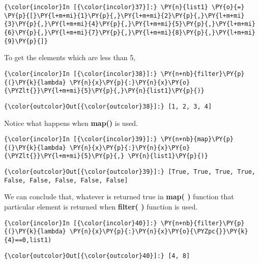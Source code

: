     \begin{Verbatim}[commandchars=\\\{\}]
{\color{incolor}In [{\color{incolor}37}]:} \PY{n}{list1} \PY{o}{=} \PY{p}{[}\PY{l+m+mi}{1}\PY{p}{,}\PY{l+m+mi}{2}\PY{p}{,}\PY{l+m+mi}{3}\PY{p}{,}\PY{l+m+mi}{4}\PY{p}{,}\PY{l+m+mi}{5}\PY{p}{,}\PY{l+m+mi}{6}\PY{p}{,}\PY{l+m+mi}{7}\PY{p}{,}\PY{l+m+mi}{8}\PY{p}{,}\PY{l+m+mi}{9}\PY{p}{]}
\end{Verbatim}

    To get the elements which are less than 5,

    \begin{Verbatim}[commandchars=\\\{\}]
{\color{incolor}In [{\color{incolor}38}]:} \PY{n+nb}{filter}\PY{p}{(}\PY{k}{lambda} \PY{n}{x}\PY{p}{:}\PY{n}{x}\PY{o}{\PYZlt{}}\PY{l+m+mi}{5}\PY{p}{,}\PY{n}{list1}\PY{p}{)}
\end{Verbatim}

            \begin{Verbatim}[commandchars=\\\{\}]
{\color{outcolor}Out[{\color{outcolor}38}]:} [1, 2, 3, 4]
\end{Verbatim}
        
    Notice what happens when \textbf{map()} is used.

    \begin{Verbatim}[commandchars=\\\{\}]
{\color{incolor}In [{\color{incolor}39}]:} \PY{n+nb}{map}\PY{p}{(}\PY{k}{lambda} \PY{n}{x}\PY{p}{:}\PY{n}{x}\PY{o}{\PYZlt{}}\PY{l+m+mi}{5}\PY{p}{,} \PY{n}{list1}\PY{p}{)}
\end{Verbatim}

            \begin{Verbatim}[commandchars=\\\{\}]
{\color{outcolor}Out[{\color{outcolor}39}]:} [True, True, True, True, False, False, False, False, False]
\end{Verbatim}
        
    We can conclude that, whatever is returned true in \textbf{map( )}
function that particular element is returned when \textbf{filter( )}
function is used.

    \begin{Verbatim}[commandchars=\\\{\}]
{\color{incolor}In [{\color{incolor}40}]:} \PY{n+nb}{filter}\PY{p}{(}\PY{k}{lambda} \PY{n}{x}\PY{p}{:}\PY{n}{x}\PY{o}{\PYZpc{}}\PY{k}{4}==0,list1)
\end{Verbatim}

            \begin{Verbatim}[commandchars=\\\{\}]
{\color{outcolor}Out[{\color{outcolor}40}]:} [4, 8]
\end{Verbatim}
        

    
  \newpage
  
    
    
    
